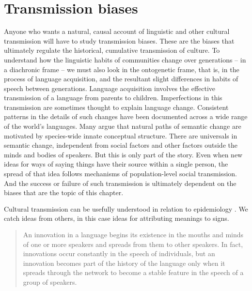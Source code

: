 
\chapter{Transmission biases}
\label{Transmission biases}



Anyone who wants a natural, causal account of linguistic and other cultural transmission will have to study transmission biases. These are the biases that ultimately regulate the historical, cumulative transmission of culture. To understand how the linguistic habits of communities change over generations -- in a diachronic frame -- we must also look in the ontogenetic frame, that is, in the process of language acquisition, and the resultant slight differences in habits of speech between generations. Language acquisition involves the effective transmission of a language from parents to children. Imperfections in this transmission are sometimes thought to explain language change. Consistent patterns in the details of such changes have been documented across a wide range of the world's languages. Many argue that natural paths of semantic change are motivated by species-wide innate conceptual structure. There are universals in semantic change, independent from social factors and other factors outside the minds and bodies of speakers. But this is only part of the story. Even when new ideas for ways of saying things have their source within a single person, the spread of that idea follows mechanisms of population-level social transmission. And the success or failure of such transmission is ultimately dependent on the biases that are the topic of this chapter.

Cultural transmission can be usefully understood in relation to epidemiology \citep{dawkins_selfish_1976,sperber_anthropology_1985}. We catch ideas from others, in this case ideas for attributing meanings to signs.


\begin{quotation}
	An innovation in a language begins its existence in the mouths and minds of one or more speakers and spreads from them to other speakers. In fact, innovations occur constantly in the speech of individuals, but an innovation becomes part of the history of the language only when it spreads through the network to become a stable feature in the speech of a group of speakers. \citep[214--215]{ross_social_1997} 

\end{quotation}
	
